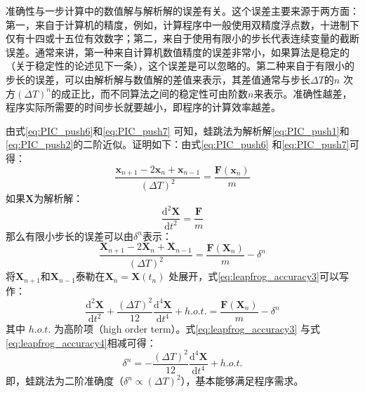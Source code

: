{      准确性与一步计算中的数值解与解析解的误差有关。这个误差主要来源于两方面：第一，来自于计算机的精度，例如，计算程序中一般使用双精度浮点数，十进制下仅有十四或十五位有效数字；第二，来自于使用有限小的步长代表连续变量的截断误差。通常来讲，第一种来自计算机数值精度的误差非常小，如果算法是稳定的（关于稳定性的论述见下一条），这个误差是可以忽略的。第二种来自于有限小的步长的误差，可以由解析解与数值解的差值来表示，其差值通常与步长$\Delta T$的$n$ 次方$(\Delta T)^n$的成正比，而不同算法之间的稳定性可由阶数$n$来表示。准确性越差，程序实际所需要的时间步长就要越小，即程序的计算效率越差。

      由式\ref{eq:PIC_push6}和\ref{eq:PIC_push7} 可知，蛙跳法为解析解\ref{eq:PIC_push1}和\ref{eq:PIC_push2}的二阶近似。证明如下：由式\ref{eq:PIC_push6} 和\ref{eq:PIC_push7}可得：
      \begin{equation}
         \label{eq:leapfrog_accuracy}
         \frac{\mathbf{x}_{n+1}-2\mathbf{x}_{n}+\mathbf{x}_{n-1}}{(\Delta T)^2} = \frac{\mathbf{F}(\mathbf{x}_n)}{m}
      \end{equation}
      如果$\mathbf{X}$为解析解：
      \begin{equation}
         \label{eq:leapfrog_accuracy2}
         \frac{\mathrm{d}^2 \mathbf{X}}{\mathrm{d} t^2} = \frac{\mathbf{F}}{m}
      \end{equation}
      那么有限小步长的误差可以由${\delta}^n$表示：
      \begin{equation}
         \label{eq:leapfrog_accuracy3}
         \frac{\mathbf{X}_{n+1}-2\mathbf{X}_{n}+\mathbf{X}_{n-1}}{(\Delta T)^2} = \frac{\mathbf{F}(\mathbf{X}_n)}{m} - {\delta}^n
      \end{equation}
      将$\mathbf{X}_{n+1}$和$\mathbf{X}_{n-1}$泰勒在$\mathbf{X}_{n}=\mathbf{X}(t_n)$ 处展开，式\ref{eq:leapfrog_accuracy3}可以写作：
      \begin{equation}
         \label{eq:leapfrog_accuracy4}
         \frac{\mathrm{d}^2 \mathbf{X}}{\mathrm{d} t^2} + \frac{(\Delta T)^2}{12} \frac{\mathrm{d}^4 \mathbf{X}}{\mathrm{d} t^4} + h.o.t. =  \frac{\mathbf{F}(\mathbf{X}_n)}{m} - {\delta}^n
      \end{equation}
      其中 $h.o.t.$ 为高阶项（high order term）。式\ref{eq:leapfrog_accuracy3} 与式\ref{eq:leapfrog_accuracy4}相减可得：
      \begin{equation}
         \label{eq:leapfrog_accuracy5}
         {\delta}^n = -\frac{(\Delta T)^2}{12} \frac{\mathrm{d}^4 \mathbf{X}}{\mathrm{d} t^4} + h.o.t.
      \end{equation}
      即，蛙跳法为二阶准确度（${\delta}^n \propto (\Delta T)^2$），基本能够满足程序需求。
}
